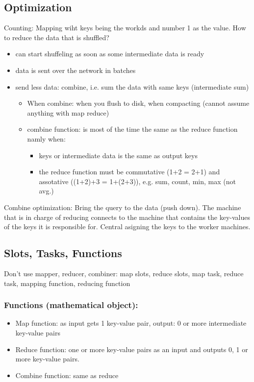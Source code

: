 \subsection{Optimization}
Counting: Mapping wiht keys being the workds and number 1 as the value.
How to reduce the data that is shuffled?
\begin{itemize}
    \item can start shuffeling as soon as some intermediate data is ready
    \item data is sent over the network in batches
    \item send less data: combine, i.e. sum the data with same keys (intermediate sum)
    \begin{itemize}
        \item When combine: when you flush to disk, when compacting (cannot assume anything with map reduce)
        \item combine function: is most of the time the same as the reduce function namly when:
        \begin{itemize}
            \item keys or intermediate data is the same as output keys
            \item the reduce function must be commutative (1+2 = 2+1) and assotative ((1+2)+3 = 1+(2+3)),
            e.g. sum, count, min, max (not avg.)
        \end{itemize}
    \end{itemize}
\end{itemize}
Combine optimization: Bring the query to the data (push down).
The machine that is in charge of reducing connects to the machine that contains the key-values of the keys it is
responsible for.
Central asigning the keys to the worker machines.

\subsection{Slots, Tasks, Functions}
Don't use mapper, reducer, combiner: map slots, reduce slots, map task, reduce task, mapping function, reducing function

\subsubsection{Functions (mathematical object):}
\begin{itemize}
    \item Map function: as input gets 1 key-value pair, output: 0 or more intermediate key-value pairs
    \item Reduce function: one or more key-value pairs as an input and outputs 0, 1 or more key-value pairs.
    \item Combine function: same as reduce
\end{itemize}

